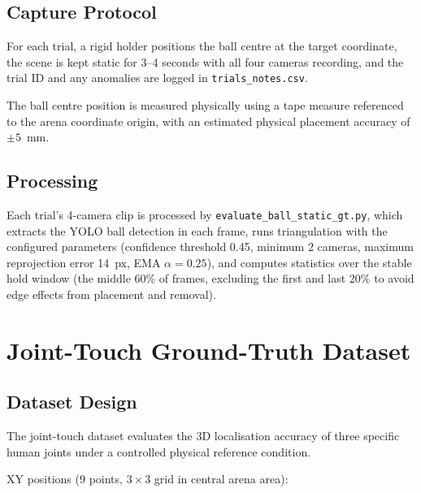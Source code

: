 \subsection{Capture Protocol}

For each trial, a rigid holder positions the ball centre at the target coordinate, the scene is kept static for 3--4 seconds with all four cameras recording, and the trial ID and any anomalies are logged in \texttt{trials\_notes.csv}.

The ball centre position is measured physically using a tape measure referenced to the arena coordinate origin, with an estimated physical placement accuracy of $\pm 5$~mm.

\subsection{Processing}

Each trial's 4-camera clip is processed by \texttt{evaluate\_ball\_static\_gt.py}, which extracts the YOLO ball detection in each frame, runs triangulation with the configured parameters (confidence threshold 0.45, minimum 2 cameras, maximum reprojection error 14~px, EMA $\alpha = 0.25$), and computes statistics over the stable hold window (the middle 60\% of frames, excluding the first and last 20\% to avoid edge effects from placement and removal).


\section{Joint-Touch Ground-Truth Dataset}

\subsection{Dataset Design}

The joint-touch dataset evaluates the 3D localisation accuracy of three specific human joints under a controlled physical reference condition.

XY positions (9 points, $3 \times 3$ grid in central arena area):

